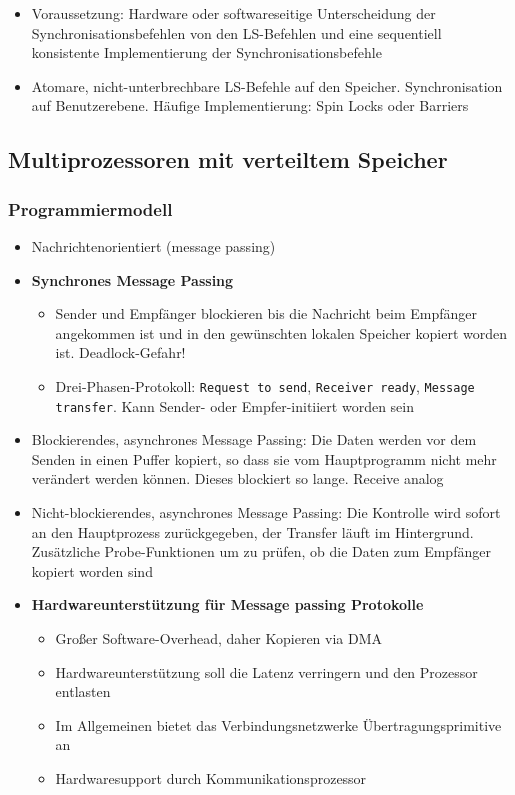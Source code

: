 \begin{itemize}
\begin{itemize}
\begin{itemize}
			\item Voraussetzung: Hardware oder softwareseitige Unterscheidung der Synchronisationsbefehlen von den LS-Befehlen und eine sequentiell konsistente Implementierung der Synchronisationsbefehle
			\item Atomare, nicht-unterbrechbare LS-Befehle auf den Speicher. Synchronisation auf Benutzerebene. Häufige Implementierung: Spin Locks oder Barriers
		\end{itemize}
	\end{itemize}
\end{itemize}


\subsection{Multiprozessoren mit verteiltem Speicher}

\subsubsection{Programmiermodell}
\begin{itemize}
	\item Nachrichtenorientiert (message passing)
	\item \textbf{Synchrones Message Passing}
	\begin{itemize}
		\item Sender und Empfänger blockieren bis die Nachricht beim Empfänger angekommen ist und in den gewünschten lokalen Speicher kopiert worden ist. Deadlock-Gefahr!
		\item Drei-Phasen-Protokoll: \texttt{Request to send}, \texttt{Receiver ready}, \texttt{Message transfer}. Kann Sender- oder Empfer-initiiert worden sein
	\end{itemize}
	\item Blockierendes, asynchrones Message Passing: Die Daten werden vor dem Senden in einen Puffer kopiert, so dass sie vom Hauptprogramm nicht mehr verändert werden können. Dieses blockiert so lange. Receive analog
	\item Nicht-blockierendes, asynchrones Message Passing: Die Kontrolle wird sofort an den Hauptprozess zurückgegeben, der Transfer läuft im Hintergrund. Zusätzliche Probe-Funktionen um zu prüfen, ob die Daten zum Empfänger kopiert worden sind
	\item \textbf{Hardwareunterstützung für Message passing Protokolle}
	\begin{itemize}
		\item Großer Software-Overhead, daher Kopieren via DMA
		\item Hardwareunterstützung soll die Latenz verringern und den Prozessor entlasten
		\item Im Allgemeinen bietet das Verbindungsnetzwerke Übertragungsprimitive an
		\item Hardwaresupport durch Kommunikationsprozessor
	\end{itemize}
\end{itemize}

